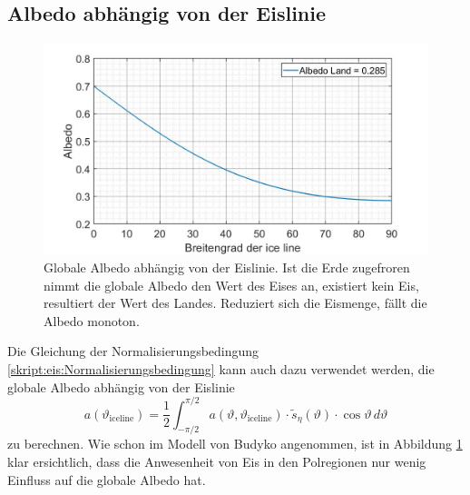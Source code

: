 \begin{refsection}
\subsection{Albedo abhängig von der Eislinie}
\begin{figure}
	\centering
	\includegraphics[width=14cm]{eis/Albedo_abh_von_der_ice_line.jpg}
	\caption{Globale Albedo abhängig von der Eislinie. Ist die Erde zugefroren nimmt die globale Albedo den Wert des Eises an, existiert kein Eis, resultiert der Wert des Landes. Reduziert sich die Eismenge, fällt die Albedo monoton.}
	\label{skript:eis:fig:Albedo_abh_von_der_ice_line}
\end{figure}
Die Gleichung der Normalisierungsbedingung \eqref{skript:eis:Normalisierungsbedingung} kann auch dazu verwendet werden, die globale Albedo abhängig von der Eislinie
\begin{equation}
	a(\vartheta_\text{iceline})
	=
	\frac{1}{2}\int_{-\pi/2}^{\pi/2}a(\vartheta,\vartheta_\text{iceline})\cdot\tilde{s}_{\eta}(\vartheta)\cdot\cos\vartheta\,d\vartheta
\end{equation}
zu berechnen. 
Wie schon im Modell von Budyko angenommen, ist in Abbildung \ref{skript:eis:fig:Albedo_abh_von_der_ice_line} klar ersichtlich, dass die Anwesenheit von Eis in den Polregionen nur wenig Einfluss auf die globale Albedo hat. 

\end{refsection}
